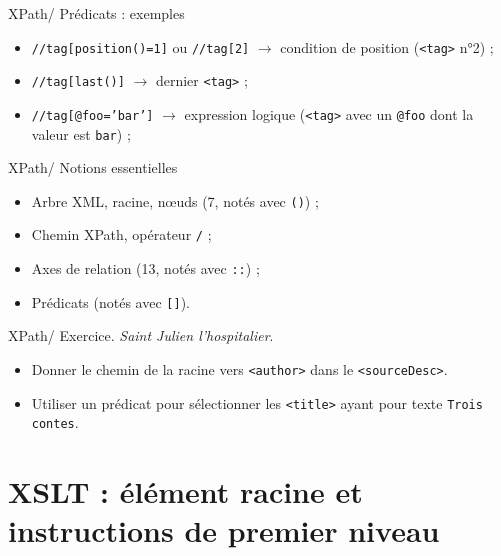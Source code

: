 \documentclass{beamer}
\begin{document}
        \begin{frame}{XPath/ Prédicats : exemples}
            \Large
            \begin{itemize}
                \item \texttt{//tag[position()=1]} ou \texttt{//tag[2]} $\rightarrow$ condition de position (\texttt{<tag>} n°2) ;
                \bigskip
                \item \texttt{//tag[last()]} $\rightarrow$ dernier \texttt{<tag>} ;
                \bigskip
                \item \texttt{//tag[@foo='bar']} $\rightarrow$ expression logique (\texttt{<tag>} avec un \texttt{@foo} dont la valeur est \texttt{bar}) ;
            \end{itemize}
        \end{frame}

        \begin{frame}{XPath/ Notions essentielles}
            \Large
            \begin{itemize}
                \item Arbre XML, racine, n\oe uds (7, notés avec \texttt{()}) ;
                \item Chemin XPath, opérateur \texttt{/} ;
                \item Axes de relation (13, notés avec \texttt{::}) ;
                \item Prédicats (notés avec \texttt{[]}).
            \end{itemize}
        \end{frame}

        \begin{frame}{XPath/ Exercice. \textit{Saint Julien l'hospitalier}.}
            \Large
            \begin{itemize}
                \item Donner le chemin de la racine vers \texttt{<author>} dans le \texttt{<sourceDesc>}.
                \bigskip
                \item Utiliser un prédicat pour sélectionner les \texttt{<title>} ayant pour texte \texttt{Trois contes}.
            \end{itemize}
        \end{frame}

        \section{XSLT : élément racine et instructions de premier niveau}
\end{document}
